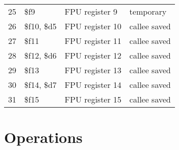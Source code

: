 \documentclass[10pt,DIV12]{scrartcl}
\begin{document}
\begin{tabular}{rlll}
  25 & \$f9 & FPU register 9       & temporary \\
  26 & \$f10, \$d5 & FPU register 10 & callee saved \\
  27 & \$f11 & FPU register 11       & callee saved \\
  28 & \$f12, \$d6 & FPU register 12 & callee saved \\
  29 & \$f13 & FPU register 13       & callee saved \\
  30 & \$f14, \$d7 & FPU register 14 & callee saved \\
  31 & \$f15 & FPU register 15       & callee saved \\
  \bottomrule
\end{tabular}

\pagebreak

\section{Operations}
\end{document}
